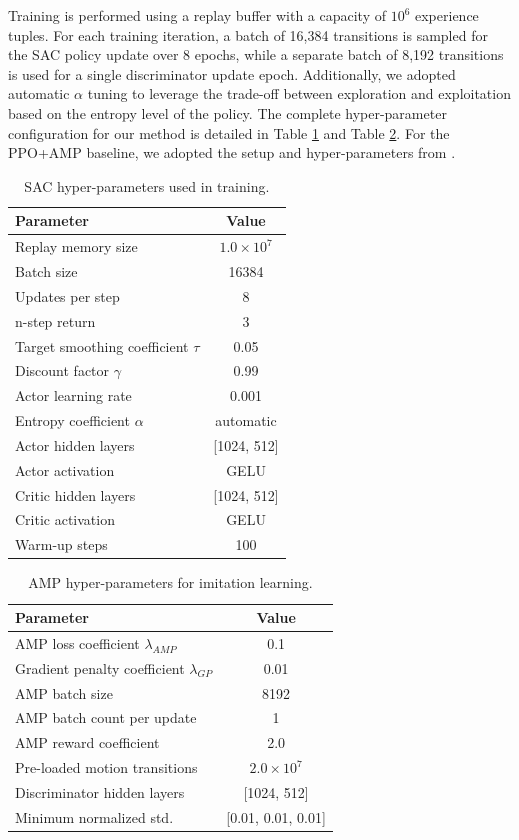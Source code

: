 \documentclass[letterpaper, 10pt, conference]{IEEEtran}
\begin{document}
Training is performed using a replay buffer with a capacity of $10^{6}$ experience tuples. For each training iteration, a batch of 16,384 transitions is sampled for the SAC policy update over 8 epochs, while a separate batch of 8,192 transitions is used for a single discriminator update epoch. Additionally, we adopted automatic $\alpha$ tuning to leverage the trade-off between exploration and exploitation based on the entropy level of the policy. The complete hyper-parameter configuration for our method is detailed in Table \ref{tab:sac_params} and Table \ref{tab:amp_params}. For the PPO+AMP baseline, we adopted the setup and hyper-parameters from \cite{Escontrela2022}.

\begin{table}[h]
\caption{SAC hyper-parameters used in training.}
\label{tab:sac_params}
\centering
\begin{tabular}{lc}
\toprule
\textbf{Parameter} & \textbf{Value} \\
\midrule
Replay memory size & $1.0\times10^{7}$ \\
Batch size & 16384 \\
Updates per step & 8 \\
n-step return & 3 \\
Target smoothing coefficient $\tau$ & 0.05 \\
Discount factor $\gamma$ & 0.99 \\
Actor learning rate & 0.001 \\
Entropy coefficient $\alpha$ & automatic \\
Actor hidden layers & [1024, 512] \\
Actor activation & GELU \\
Critic hidden layers & [1024, 512] \\
Critic activation & GELU \\
Warm-up steps & 100 \\
\bottomrule
\end{tabular}
\end{table}

\begin{table}[h]
\caption{AMP hyper-parameters for imitation learning.}
\label{tab:amp_params}
\centering
\begin{tabular}{lc}
\toprule
\textbf{Parameter} & \textbf{Value} \\
\midrule
AMP loss coefficient $\lambda_{AMP}$ & 0.1 \\
Gradient penalty coefficient $\lambda_{GP}$ & 0.01 \\
AMP batch size & 8192 \\
AMP batch count per update & 1 \\
AMP reward coefficient & 2.0 \\
Pre-loaded motion transitions & $2.0\times10^{7}$ \\
Discriminator hidden layers & [1024, 512] \\
Minimum normalized std. & [0.01, 0.01, 0.01] \\
\bottomrule
\end{tabular}
\end{table}
\end{document}
